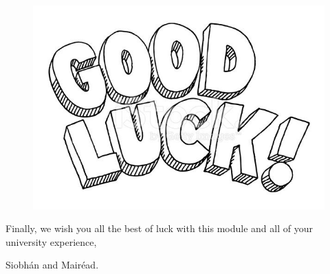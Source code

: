 \documentclass{article}
\begin{document}
\vspace{2cm}
\begin{figure}[h]
    \centering
    \includegraphics[width=.8\textwidth]{img/good-luck.jpeg}

    \end{figure}

Finally, we wish you all the best of luck with this module and all of your university experience,
\vspace{1cm}

Siobh\'an and Mair\'ead.
\end{document}
